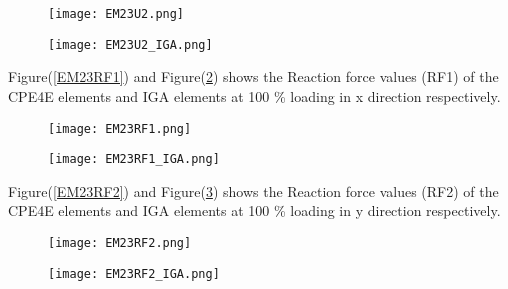 \documentclass[11pt]{article}
\begin{document}
\begin{figure}[H]
	\centering
	\begin{minipage}{.5\textwidth}
		\centering
		\texttt{[image: EM23U2.png]}
		\label{EM23U2}
	\end{minipage}%
	\begin{minipage}{.5\textwidth}
		\centering
		\texttt{[image: EM23U2\_IGA.png]}
		\label{EM23U2_IGA}
	\end{minipage}
\end{figure}
Figure(\ref{EM23RF1}) and Figure(\ref{EM23RF1_IGA}) shows the Reaction force values (RF1) of the CPE4E elements and IGA elements at 100 \% loading in x direction respectively. \\
\begin{figure}[H]
	\centering
	\begin{minipage}{.5\textwidth}
		\centering
		\texttt{[image: EM23RF1.png]}
		\label{EM23RF1}
	\end{minipage}%
	\begin{minipage}{.5\textwidth}
		\centering
		\texttt{[image: EM23RF1\_IGA.png]}
		\label{EM23RF1_IGA}
	\end{minipage}
\end{figure}
Figure(\ref{EM23RF2}) and Figure(\ref{EM23RF2_IGA}) shows the Reaction force values (RF2) of the CPE4E elements and IGA elements at 100 \% loading in y direction respectively. \\
\begin{figure}[H]
	\centering
	\begin{minipage}{.5\textwidth}
		\centering
		\texttt{[image: EM23RF2.png]}
		\label{EM23RF2}
	\end{minipage}%
	\begin{minipage}{.5\textwidth}
		\centering
		\texttt{[image: EM23RF2\_IGA.png]}
		\label{EM23RF2_IGA}
	\end{minipage}
\end{figure}
\end{document}
